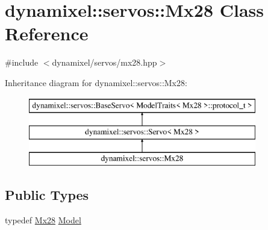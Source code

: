 \hypertarget{classdynamixel_1_1servos_1_1_mx28}{}\section{dynamixel\+:\+:servos\+:\+:Mx28 Class Reference}
\label{classdynamixel_1_1servos_1_1_mx28}


{\ttfamily \#include $<$dynamixel/servos/mx28.\+hpp$>$}

Inheritance diagram for dynamixel\+:\+:servos\+:\+:Mx28\+:\begin{figure}[H]
\begin{center}
\leavevmode
\includegraphics[height=3.000000cm]{classdynamixel_1_1servos_1_1_mx28}
\end{center}
\end{figure}
\subsection*{Public Types}
\begin{DoxyCompactItemize}
\item 
typedef \hyperlink{classdynamixel_1_1servos_1_1_mx28}{Mx28} \hyperlink{classdynamixel_1_1servos_1_1_mx28_a417eef0237fabc40e4dde49697c654a6}{Model}
\end{DoxyCompactItemize}
